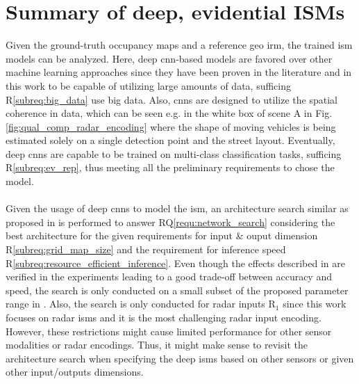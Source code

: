 \section{Summary of deep, evidential ISMs}
\label{sec:disc_deep_ev_isms}
Given the ground-truth occupancy maps and a reference geo \gls{irm}, the trained \gls{ism} models can be analyzed. Here, deep \gls{cnn}-based models are favored over other machine learning approaches since they have been proven in the literature and in this work to be capable of utilizing large amounts of data, sufficing R\ref{subreq:big_data} use big data. Also, \gls{cnn}s are designed to utilize the spatial coherence in data, which can be seen e.g. in the white box of scene A in Fig. \ref{fig:qual_comp_radar_encoding} where the shape of moving vehicles is being estimated solely on a single detection point and the street layout. Eventually, deep \gls{cnn}s are capable to be trained on multi-class classification tasks, sufficing R\ref{subreq:ev_rep}, thus meeting all the preliminary requirements to chose the model.
\\\\
Given the usage of deep \gls{cnn}s to model the \gls{ism}, an architecture search similar as proposed in \cite{radosavovic2020designing} is performed to answer RQ\ref{requ:network_search} considering the best architecture for the given requirements for input \& ouput dimension R\ref{subreq:grid_map_size} and the requirement for inference speed R\ref{subreq:resource_efficient_inference}. Even though the effects described in \cite{radosavovic2020designing} are verified in the experiments leading to a good trade-off between accuracy and speed, the search is only conducted on a small subset of the proposed parameter range in \cite{radosavovic2020designing}. Also, the search is only conducted for radar inputs R$_1$ since this work focuses on radar \gls{ism}s and it is the most challenging radar input encoding. However, these restrictions might cause limited performance for other sensor modalities or radar encodings. Thus, it might make sense to revisit the architecture search when specifying the deep \gls{ism}s based on other sensors or given other input/outputs dimensions.
\\\\
